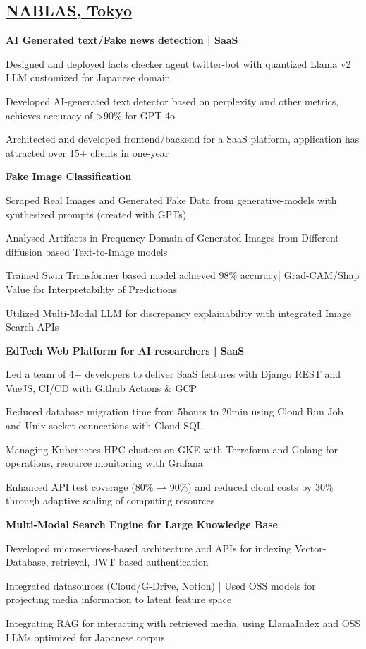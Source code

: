 \documentclass[a4paper,10pt]{article}
\newcommand{\SubItem}[1]{
    {\setlength\itemindent{13pt} \item[\raisebox{.25\height}{\tiny\square}] #1}
}
\newlength{\itemgap}
\newlength{\itembefore}
\newcommand\scl{1.05}
\begin{document}
\subsection{{\textbf{\scalebox{\scl}{\textcolor{black!100}{AI \& Software Engineer | }}}\href{https://www.nablas.com/}{\textbf{\textcolor{black!100}{NABLAS, Tokyo}}} }  \hfill\scalebox{0.9}{[Aug'22-Mar'25]}}
\begin{itemize}[topsep=\itembefore,itemsep=\itemgap,partopsep=0pt, parsep=0pt]

  \item \textbf {AI Generated text/Fake news detection | SaaS}
  \SubItem{Designed and deployed facts checker agent twitter-bot with quantized Llama v2 LLM customized for Japanese domain}
  \SubItem{Developed AI-generated text detector based on perplexity and other metrics, achieves accuracy of >90\% for GPT-4o}
  \SubItem{Architected and developed frontend/backend for a SaaS platform, application has attracted over 15+ clients in one-year}

  \item \textbf {Fake Image Classification}
  \SubItem{Scraped Real Images and Generated Fake Data from generative-models with synthesized prompts (created with GPTs)}
  \SubItem{Analysed Artifacts in Frequency Domain of Generated Images from Different diffusion based Text-to-Image models }
  \SubItem{Trained Swin Transformer based model achieved 98\% accuracy| Grad-CAM/Shap Value for Interpretability of Predictions}
  \SubItem{Utilized Multi-Modal LLM for discrepancy explainability with integrated Image Search APIs}

  \item \textbf {EdTech Web Platform for AI researchers | SaaS}
  \SubItem{Led a team of 4+ developers to deliver SaaS features with Django REST and VueJS, CI/CD with Github Actions \& GCP}
  \SubItem{Reduced database migration time from 5hours to 20min using Cloud Run Job and Unix socket connections with Cloud SQL}
  \SubItem{Managing Kubernetes HPC clusters on GKE with Terraform and Golang for operations, resource monitoring with Grafana}
  \SubItem{Enhanced API test coverage (80\% → 90\%) and reduced cloud costs by 30\% through adaptive scaling of computing resources}

  \item \textbf {Multi-Modal Search Engine for Large Knowledge Base}
  \SubItem{Developed microservices-based architecture and APIs for indexing Vector-Database, retrieval, JWT based authentication}
  \SubItem{Integrated datasources (Cloud/G-Drive, Notion) | Used OSS models for projecting media information to latent feature space}
  \SubItem{Integrating RAG for interacting with retrieved media, using LlamaIndex and OSS LLMs optimized for Japanese corpus}


\end{itemize}
\end{document}
